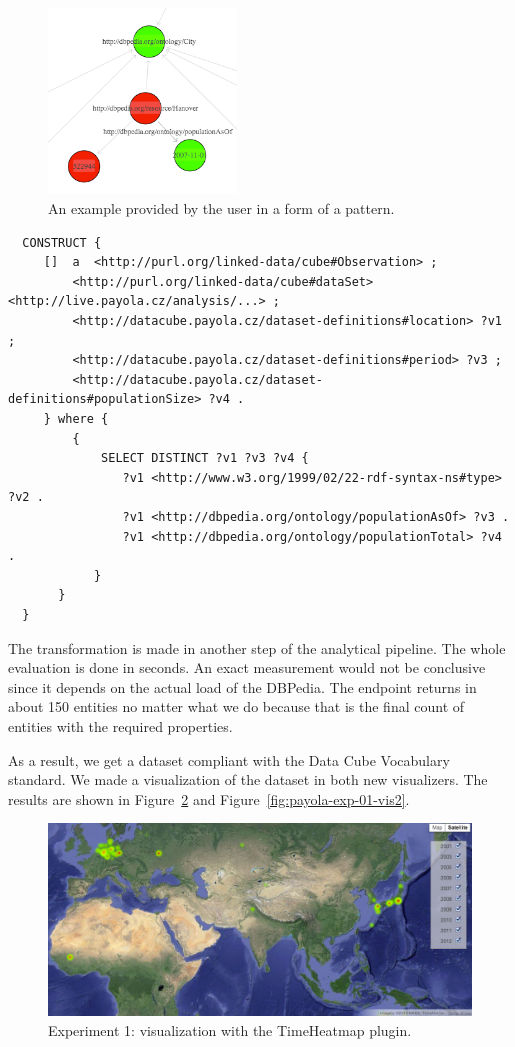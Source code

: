 \begin{figure}
  \centering
  \includegraphics[width=50mm]{img/payola-exp-01-selection.png}
  \caption{An example provided by the user in a form of a pattern.}
  \label{fig:payola-exp-01-selection}
\end{figure}

\scriptsize
\begin{verbatim}
  CONSTRUCT {
     []  a  <http://purl.org/linked-data/cube#Observation> ;
         <http://purl.org/linked-data/cube#dataSet> <http://live.payola.cz/analysis/...> ;
         <http://datacube.payola.cz/dataset-definitions#location> ?v1 ;
         <http://datacube.payola.cz/dataset-definitions#period> ?v3 ;
         <http://datacube.payola.cz/dataset-definitions#populationSize> ?v4 .
     } where {
         {
             SELECT DISTINCT ?v1 ?v3 ?v4 {
                ?v1 <http://www.w3.org/1999/02/22-rdf-syntax-ns#type> ?v2 .
                ?v1 <http://dbpedia.org/ontology/populationAsOf> ?v3 .
                ?v1 <http://dbpedia.org/ontology/populationTotal> ?v4 .
            }
       }
  } 
\end{verbatim}
\normalsize

The transformation is made in another step of the analytical pipeline. The 
whole evaluation is done in seconds. An exact measurement would not be 
conclusive since it depends on the actual load of the DBPedia. The endpoint 
returns in about 150 entities no matter what we do because that is the final
count of entities with the required properties.

As a result, we get a dataset compliant with the Data Cube Vocabulary standard. 
We made a visualization of the dataset in both new visualizers. The results are 
shown in Figure~\ref{fig:payola-exp-01-vis} and Figure~\ref{fig:payola-exp-01-vis2}.

\begin{figure}
  \centering
  \includegraphics[width=140mm]{img/payola-exp-01-vis.png}
  \caption{Experiment 1: visualization with the TimeHeatmap plugin.}
  \label{fig:payola-exp-01-vis}
\end{figure}

